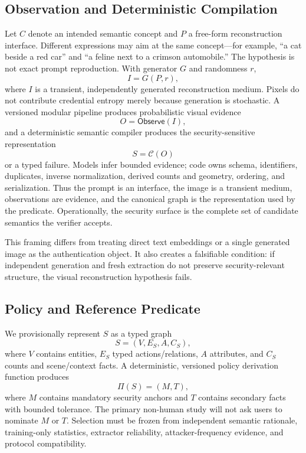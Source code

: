 \documentclass[compsoc,conference,a4paper,10pt,times]{IEEEtran}
\begin{document}
\subsection{Observation and Deterministic Compilation}
Let $C$ denote an intended semantic concept and $P$ a free-form reconstruction interface. Different expressions may aim at the same concept---for example, ``a cat beside a red car'' and ``a feline next to a crimson automobile.'' The hypothesis is not exact prompt reproduction. With generator $G$ and randomness $r$,
\begin{equation}
  I = G(P,r),
\end{equation}
where $I$ is a transient, independently generated reconstruction medium. Pixels do not contribute credential entropy merely because generation is stochastic. A versioned modular pipeline produces probabilistic visual evidence
\begin{equation}
  O = \mathsf{Observe}(I),
\end{equation}
and a deterministic semantic compiler produces the security-sensitive representation
\begin{equation}
  S = \mathcal{C}(O)
\end{equation}
or a typed failure. Models infer bounded evidence; code owns schema, identifiers, duplicates, inverse normalization, derived counts and geometry, ordering, and serialization. Thus the prompt is an interface, the image is a transient medium, observations are evidence, and the canonical graph is the representation used by the predicate. Operationally, the security surface is the complete set of candidate semantics the verifier accepts.

This framing differs from treating direct text embeddings or a single generated image as the authentication object. It also creates a falsifiable condition: if independent generation and fresh extraction do not preserve security-relevant structure, the visual reconstruction hypothesis fails.

\subsection{Policy and Reference Predicate}
We provisionally represent $S$ as a typed graph
\begin{equation}
  S=(V,E_S,A,C_S),
\end{equation}
where $V$ contains entities, $E_S$ typed actions/relations, $A$ attributes, and $C_S$ counts and scene/context facts. A deterministic, versioned policy derivation function produces
\begin{equation}
  \Pi(S)=(M,T),
\end{equation}
where $M$ contains mandatory security anchors and $T$ contains secondary facts with bounded tolerance. The primary non-human study will not ask users to nominate $M$ or $T$. Selection must be frozen from independent semantic rationale, training-only statistics, extractor reliability, attacker-frequency evidence, and protocol compatibility.
\end{document}
